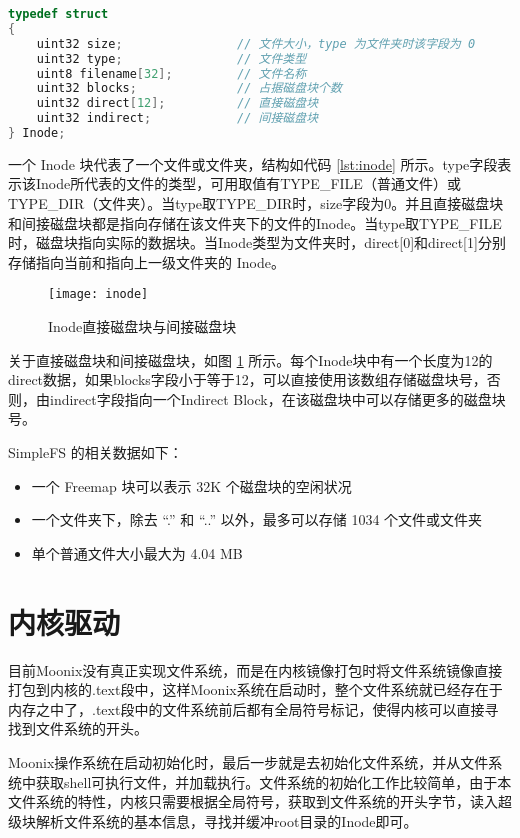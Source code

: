 \begin{lstlisting}[language={C}, caption={SimpleFS Inode结构}, label={lst:inode}]
typedef struct
{
	uint32 size;                // 文件大小，type 为文件夹时该字段为 0
	uint32 type;                // 文件类型
	uint8 filename[32];         // 文件名称
	uint32 blocks;              // 占据磁盘块个数
	uint32 direct[12];          // 直接磁盘块
	uint32 indirect;            // 间接磁盘块
} Inode;
\end{lstlisting}

一个 Inode 块代表了一个文件或文件夹，结构如代码 \ref{lst:inode} 所示。type字段表示该Inode所代表的文件的类型，可用取值有TYPE\_FILE（普通文件）或TYPE\_DIR（文件夹）。当type取TYPE\_DIR时，size字段为0。并且直接磁盘块和间接磁盘块都是指向存储在该文件夹下的文件的Inode。当type取TYPE\_FILE时，磁盘块指向实际的数据块。当Inode类型为文件夹时，direct[0]和direct[1]分别存储指向当前和指向上一级文件夹的 Inode。

\begin{figure}[htpb]
	\centering
	\texttt{[image: inode]}
	\setlength{\abovecaptionskip}{2pt}
	\caption{Inode直接磁盘块与间接磁盘块}
	\label{pic:inode}
\end{figure}

关于直接磁盘块和间接磁盘块，如图 \ref{pic:inode} 所示。每个Inode块中有一个长度为12的direct数据，如果blocks字段小于等于12，可以直接使用该数组存储磁盘块号，否则，由indirect字段指向一个Indirect Block，在该磁盘块中可以存储更多的磁盘块号。

SimpleFS 的相关数据如下：

\begin{itemize}
	\item 一个 Freemap 块可以表示 32K 个磁盘块的空闲状况
	\item 一个文件夹下，除去 “.” 和 “..” 以外，最多可以存储 1034 个文件或文件夹
	\item 单个普通文件大小最大为 4.04 MB
\end{itemize}

\section{内核驱动}

目前Moonix没有真正实现文件系统，而是在内核镜像打包时将文件系统镜像直接打包到内核的.text段中，这样Moonix系统在启动时，整个文件系统就已经存在于内存之中了，.text段中的文件系统前后都有全局符号标记，使得内核可以直接寻找到文件系统的开头。

Moonix操作系统在启动初始化时，最后一步就是去初始化文件系统，并从文件系统中获取shell可执行文件，并加载执行。文件系统的初始化工作比较简单，由于本文件系统的特性，内核只需要根据全局符号，获取到文件系统的开头字节，读入超级块解析文件系统的基本信息，寻找并缓冲root目录的Inode即可。

